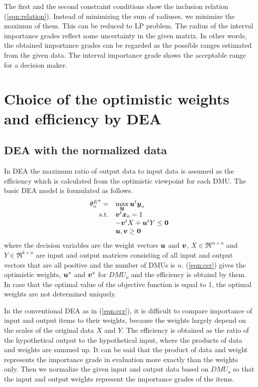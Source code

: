 The first and the second constraint conditions show the inclusion relation (\ref{eqn:relation}). 
Instead of minimizing the sum of radiuses, we minimize the maximun of them. 
This can be reduced to LP problem. 
The radius of the interval importance grades reflect some uncertainty in the given matrix. 
In other words, the obtained importance grades can be regarded as the possible ranges estimated from the given data. 
The interval importance grade shows the acceptable range for a decision maker. 

\section{Choice of the optimistic weights and efficiency by DEA}

\subsection{DEA with the normalized data}

In DEA the maximum ratio of output data to input data is assumed as the efficiency which is calculated from the optimistic viewpoint for each DMU. 
The basic DEA model is formulated as follows. 
\begin{equation}\begin{array}{rl}
{\theta{_o^E}}^*=&{\displaystyle\max_{{\mbox{\boldmath$u$}}} {\mbox{\boldmath$u$}}^t{\mbox{\boldmath$y$}}_o}    \\
{\rm{s.t.}} & {\mbox{\boldmath$v$}}^t{\mbox{\boldmath$x$}}_o  = 1 \\
 & -{\mbox{\boldmath$v$}}^tX+{\mbox{\boldmath$u$}}^tY  \leq \mbox{\bf 0} \\
 &  {\mbox{\boldmath$u$}},{\mbox{\boldmath$v$}}  \geq \mbox{\bf 0} \\
\end{array}
\label{eqn:ccr}
\end{equation}
where the decision variables are the weight vectors $\mbox{\boldmath$u$}$ and $\mbox{\boldmath$v$}$, $X\in{\Re}^{m\times n}$ and $Y\in{\Re}^{k\times n}$ are input and output matrices consisting of all input and output vectors that are all positive and the number of DMUs is $n$. 
(\ref{eqn:ccr}) gives the optimistic weights, $\mbox{\boldmath$u$}^*$ and $\mbox{\boldmath$v$}^*$ for $DMU_o$ and the efficiency is obtaind by them. 
In case that the optimal value of the objective function is equal to 1, the optimal weights are not determined uniquely. 

In the conventional DEA as in (\ref{eqn:ccr}), it is difficult to compare importance of input and output items to their weights, because the weights largely depend on the scales of the original data $X$ and $Y$. 
The efficiency is obtained as the ratio of the hypothetical output to the hypothetical input, where the products of data and weights are summed up. 
It can be said that the product of data and weight represents the importance grade in evaluation more exactly than the weights only. 
Then we normalize the given input and output data based on $DMU_o$ so that the input and output weights represent the importance grades of the items. 

